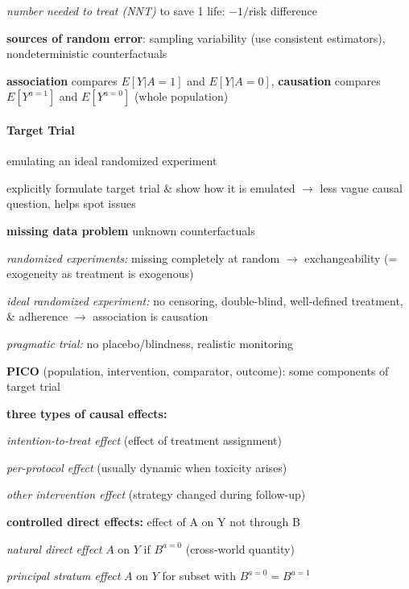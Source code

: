 \documentclass[8pt,twoside]{extarticle}
\begin{document}
\begin{multicols}{2}
\noindent \textit{number needed to treat (NNT)} to save 1 life: $-1/$risk difference

\noindent \textbf{sources of random error}: sampling variability (use consistent estimators), nondeterministic counterfactuals

\noindent\textbf{association} compares $E\left[Y|A=1\right]$ and $E\left[Y|A=0\right]$, \textbf{causation} compares $E\left[Y^{a=1}\right]$ and $E\left[Y^{a=0}\right]$ (whole population)









\paragraph{Target Trial} emulating an ideal randomized experiment

\noindent explicitly formulate target trial \& show how it is emulated $\rightarrow$ \newline less vague causal question, helps spot issues

\noindent \textbf{missing data problem} unknown counterfactuals

\noindent \textit{randomized experiments:} missing completely at random $\rightarrow$ exchangeability (= exogeneity as treatment is exogenous)

\noindent \textit{ideal randomized experiment:} no censoring, double-blind, well-defined treatment, \& adherence $\rightarrow$ association is causation

\noindent \textit{pragmatic trial:} no placebo/blindness, realistic monitoring


\noindent \textbf{PICO} (population, intervention, comparator, outcome): some components of target trial

\noindent \textbf{three types of causal effects:}

\textit{intention-to-treat effect} (effect of treatment assignment)

\textit{per-protocol effect} (usually dynamic when toxicity arises)

\textit{other intervention effect} (strategy changed during follow-up)


\noindent \textbf{controlled direct effects:} effect of A on Y not through B

\textit{natural direct effect}  $A$ on $Y$ if $B^{a=0}$ (cross-world quantity)

\textit{principal stratum effect} $A$ on $Y$ for subset with $B^{a=0} = B^{a=1}$


\end{multicols}
\end{document}
